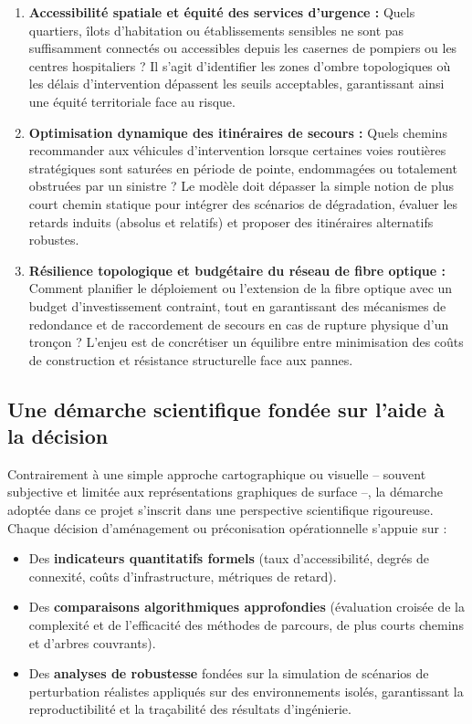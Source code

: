 \begin{enumerate}
    \item \textbf{Accessibilité spatiale et équité des services d'urgence :} 
    Quels quartiers, îlots d'habitation ou établissements sensibles ne sont pas suffisamment connectés ou accessibles depuis les casernes de pompiers ou les centres hospitaliers ? Il s'agit d'identifier les zones d'ombre topologiques où les délais d'intervention dépassent les seuils acceptables, garantissant ainsi une équité territoriale face au risque.
    
    \item \textbf{Optimisation dynamique des itinéraires de secours :} 
    Quels chemins recommander aux véhicules d'intervention lorsque certaines voies routières stratégiques sont saturées en période de pointe, endommagées ou totalement obstruées par un sinistre ? Le modèle doit dépasser la simple notion de plus court chemin statique pour intégrer des scénarios de dégradation, évaluer les retards induits (absolus et relatifs) et proposer des itinéraires alternatifs robustes.
    
    \item \textbf{Résilience topologique et budgétaire du réseau de fibre optique :} 
    Comment planifier le déploiement ou l'extension de la fibre optique avec un budget d'investissement contraint, tout en garantissant des mécanismes de redondance et de raccordement de secours en cas de rupture physique d'un tronçon ? L'enjeu est de concrétiser un équilibre entre minimisation des coûts de construction et résistance structurelle face aux pannes.
\end{enumerate}

\subsection{Une démarche scientifique fondée sur l'aide à la décision}
Contrairement à une simple approche cartographique ou visuelle – souvent subjective et limitée aux représentations graphiques de surface –, la démarche adoptée dans ce projet s'inscrit dans une perspective scientifique rigoureuse. Chaque décision d'aménagement ou préconisation opérationnelle s'appuie sur :
\begin{itemize}
    \item Des \textbf{indicateurs quantitatifs formels} (taux d'accessibilité, degrés de connexité, coûts d'infrastructure, métriques de retard).
    \item Des \textbf{comparaisons algorithmiques approfondies} (évaluation croisée de la complexité et de l'efficacité des méthodes de parcours, de plus courts chemins et d'arbres couvrants).
    \item Des \textbf{analyses de robustesse} fondées sur la simulation de scénarios de perturbation réalistes appliqués sur des environnements isolés, garantissant la reproductibilité et la traçabilité des résultats d'ingénierie.
\end{itemize}